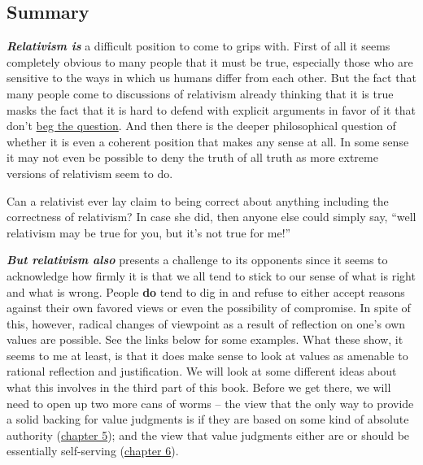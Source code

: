 \documentclass[12pt, openany]{book}
\makeatletter
\newenvironment{kframe}{%
\medskip{}
\setlength{\fboxsep}{.8em}
 \def\at@end@of@kframe{}%
 \ifinner\ifhmode%
  \def\at@end@of@kframe{\end{minipage}}%
  \begin{minipage}{\columnwidth}%
 \fi\fi%
 \def\FrameCommand##1{\hskip\@totalleftmargin \hskip-\fboxsep
 \colorbox{shadecolor}{##1}\hskip-\fboxsep
     \hskip-\linewidth \hskip-\@totalleftmargin \hskip\columnwidth}%
 \MakeFramed {\advance\hsize-\width
   \@totalleftmargin\z@ \linewidth\hsize
   \@setminipage}}%
 {\par\unskip\endMakeFramed%
 \at@end@of@kframe}
\newenvironment{rmdblock}[1]
  {
  \begin{itemize}
  \renewcommand{\labelitemi}{
    \raisebox{-.7\height}[0pt][0pt]{
      {\setkeys{Gin}{width=3em,keepaspectratio}\texttt{[image: img/\#1]}}
    }
  }
  \setlength{\fboxsep}{1em}
  \begin{kframe}
  \item
  }
  {
  \end{kframe}
  \end{itemize}
  }
\newenvironment{question}
  {\begin{rmdblock}{question}}
  {\end{rmdblock}}
\makeatother
\begin{document}
\hypertarget{summary}{%
\subsection*{Summary}\label{summary}}


\textbf{\emph{Relativism is}} a difficult position to come to grips with. First of all it seems completely obvious to many people that it must be true, especially those who are sensitive to the ways in which us humans differ from each other. But the fact that many people come to discussions of relativism already thinking that it is true masks the fact that it is hard to defend with explicit arguments in favor of it that don't \protect\hyperlink{begging-the-question}{beg the question}. And then there is the deeper philosophical question of whether it is even a coherent position that makes any sense at all. In some sense it may not even be possible to deny the truth of all truth as more extreme versions of relativism seem to do.

\begin{question}

Can a relativist ever lay claim to being correct about anything including the correctness of relativism? In case she did, then anyone else could simply say, ``well relativism may be true for you, but it's not true for me!''

\end{question}

\textbf{\emph{But relativism also}} presents a challenge to its opponents since it seems to acknowledge how firmly it is that we all tend to stick to our sense of what is right and what is wrong. People \textbf{do} tend to dig in and refuse to either accept reasons against their own favored views or even the possibility of compromise. In spite of this, however, radical changes of viewpoint as a result of reflection on one's own values are possible. See the links below for some examples. What these show, it seems to me at least, is that it does make sense to look at values as amenable to rational reflection and justification. We will look at some different ideas about what this involves in the third part of this book. Before we get there, we will need to open up two more cans of worms -- the view that the only way to provide a solid backing for value judgments is if they are based on some kind of absolute authority (\protect\hyperlink{religion}{chapter 5}); and the view that value judgments either are or should be essentially self-serving (\protect\hyperlink{egoism}{chapter 6}).
\end{document}
